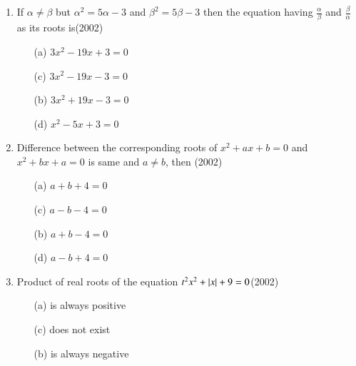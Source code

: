 \documentclass[journal,12pt,twocolumn]{IEEEtran}
\theoremstyle{remark}
\begin{document}
\begin{enumerate}
\item 
If $\alpha\neq\beta$ but ${\alpha^{2}=5\alpha-3}$ and ${\beta^{2}=5\beta-3}$ then the equation having $\frac{\alpha}{\beta}$ and $\frac{\beta}{\alpha}$ as its roots is\hfill(2002)

\begin{multicols}{2}

\begin{enumerate}

\item[(a)]$3x^{2}-19x+3=0$

\item[(c)]$3x^{2}-19x-3=0$

\item[(b)] $3x^{2}+19x-3=0$

\item[(d)] $x^{2}-5x+3=0$

\end{enumerate}

\end{multicols}

\item 
Difference between the corresponding roots of ${x^{2}+ax+b=0}$ and ${x^{2}+bx+a=0}$ is same and $a\not=b$, then \hfill(2002)
\begin{multicols}{2}
    
\begin{enumerate}

\item[(a)] $a+b+4=0$

\item[(c)] $a-b-4=0$

\item[(b)] $a+b-4=0$

\item[(d)]$a-b+4=0$
\end{enumerate}
\end{multicols}
\item 
Product of real roots of the equation ${t^{2}x^{2}+\left\vert x\right\vert+9=0}$\hfill(2002)
\begin{multicols}{2}
\begin{enumerate}

\item[(a)] is always positive

\item[(c)] does not exist

\item[(b)] is always negative


\end{enumerate}
\end{multicols}
\end{enumerate}
\end{document}
